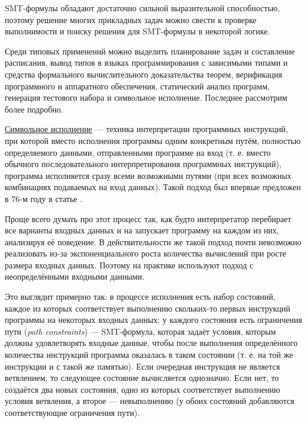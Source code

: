 
SMT-формулы обладают достаточно сильной выразительной способностью, поэтому решение многих прикладных задач можно свести к проверке выполнимости и поиску решения для SMT-формулы в некоторой логике.

Среди типовых применений можно выделить планирование задач и составление расписания, вывод типов в языках программирования с зависимыми типами и средства формального вычислительного доказательства теорем, верификация программного и аппаратного обеспечения, статический анализ программ, генерация тестового набора и символьное исполнение. Последнее рассмотрим более подробно.


\underline{Символьное исполнение} --- техника интерпретации программных инструкций, при которой вместо исполнения программы одним конкретным путём, полностью определяемого данными, отправленными программе на вход (т. е. вместо обычного последовательного интерпретирования программных инструкций), программа исполняется сразу всеми возможными путями (при всех возможных комбинациях подаваемых на вход данных). Такой подход был впервые предложен в 76-м году в статье \cite{symbex-intro-paper}.

Проще всего думать про этот процесс так, как будто интерпретатор перебирает все варианты входных данных и на запускает программу на каждом из них, анализируя её поведение. В действительности же такой подход почти невозможно реализовать из-за экспоненциального роста количества вычислений при росте размера входных данных. Поэтому на практике используют подход с неопределёнными входными данными.

Это выглядит примерно так: в процессе исполнения есть набор состояний, каждое из которых соответствует выполнению скольких-то первых инструкций программы на некоторых входных данных; у каждого состояния есть ограничения пути (\textit{path constraints}) --- SMT-формула, которая задаёт условия, которым должны удовлетворять входные данные, чтобы после выполнения определённого количества инструкций программа оказалась в таком состоянии (т. е. на той же инструкции и с такой же памятью). Если очередная инструкция не является ветвлением, то следующее состояние вычисляется однозначно. Если нет, то создаётся два новых состояния, одно из которых соответствует выполнению условия ветвления, а второе --- невыполнению (у обоих состояний добавляются соответствующие ограничения пути).

